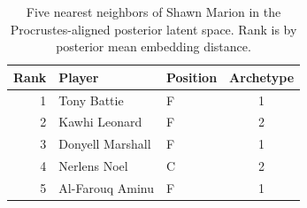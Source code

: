 \begin{table}[htbp]
  \centering\small
  \begin{tabular}{rllc}
    \toprule
    Rank & Player & Position & Archetype \\
    \midrule
    1 & Tony Battie & F & 1 \\
    2 & Kawhi Leonard & F & 2 \\
    3 & Donyell Marshall & F & 1 \\
    4 & Nerlens Noel & C & 2 \\
    5 & Al-Farouq Aminu & F & 1 \\
    \bottomrule
  \end{tabular}
  \caption{Five nearest neighbors of Shawn Marion in the Procrustes-aligned posterior latent space. Rank is by posterior mean embedding distance.}
  \label{tab:Shawn_Marion_neighbors}
\end{table}

